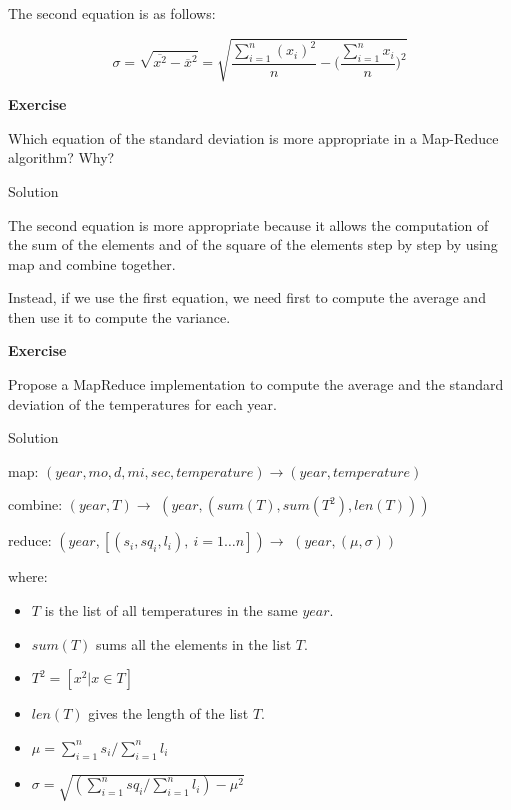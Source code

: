 \documentclass[
]{article}
\providecommand{\tightlist}{%
  \setlength{\itemsep}{0pt}\setlength{\parskip}{0pt}}
\newenvironment{infobox}[1]
  {
  \begin{itemize}
  \renewcommand{\labelitemi}{
    \raisebox{-.7\height}[0pt][0pt]{
      
    }
  }
  \setlength{\fboxsep}{1em}
  \begin{whitebox}
  \item
  }
  {
  \end{whitebox}
  \end{itemize}
  }
\theoremstyle{definition}
\theoremstyle{definition}
\theoremstyle{definition}
\theoremstyle{remark}
\let\BeginKnitrBlock\begin \let\EndKnitrBlock\end
\begin{document}
The second equation is as follows:

\[
\sigma = \sqrt{\overline{x^2} - \overline{x}^2} = \sqrt{\frac{\sum_{i=1}^n (x_i)^2}{n} - \Bigg(\frac{\sum_{i=1}^n x_i}{n}\Bigg)^2} 
\]

\begin{infobox}{exercisebox}

\textbf{Exercise}

\BeginKnitrBlock{exercise}
\protect\hypertarget{exr:unnamed-chunk-5}{}{\label{exr:unnamed-chunk-5} }
Which equation of the standard deviation
is more appropriate in a Map-Reduce algorithm?
Why?
\EndKnitrBlock{exercise}

\end{infobox}

Solution

\begin{infobox}{exercisebox}

The second equation is more appropriate because it allows the computation
of the sum of the elements and of the square of the elements step by step
by using map and combine together.

Instead, if we use the first equation, we need first to compute the average and then use it
to compute the variance.

\end{infobox}

\begin{infobox}{exercisebox}

\textbf{Exercise}

\BeginKnitrBlock{exercise}
\protect\hypertarget{exr:unnamed-chunk-6}{}{\label{exr:unnamed-chunk-6} }
Propose a MapReduce implementation to compute the average and the standard
deviation of the temperatures for each year.
\EndKnitrBlock{exercise}

\end{infobox}

Solution

\begin{infobox}{exercisebox}

map: \((year, mo, d, mi, sec, temperature) \rightarrow (year, temperature)\)

combine: \((year, T) \rightarrow\) \((year, (sum(T), sum(T^2), len(T)))\)

reduce: \((year, [(s_{i}, sq_{i}, l_{i}),\ i=1\dots n]) \rightarrow\) \((year, (\mu, \sigma))\)

where:

\begin{itemize}
\tightlist
\item
  \(T\) is the list of all temperatures in the same \(year\).
\item
  \(sum(T)\) sums all the elements in the list \(T\).
\item
  \(T^2 = [x^2 | x\in T]\)
\item
  \(len(T)\) gives the length of the list \(T\).
\item
  \(\mu = \sum_{i=1}^n s_{i}/ \sum_{i=1}^n l_{i}\)
\item
  \(\sigma = \sqrt{ (\sum_{i=1}^n sq_{i}/ \sum_{i=1}^n l_{i}) - \mu^2 }\)
\end{itemize}

\end{infobox}
\end{document}
